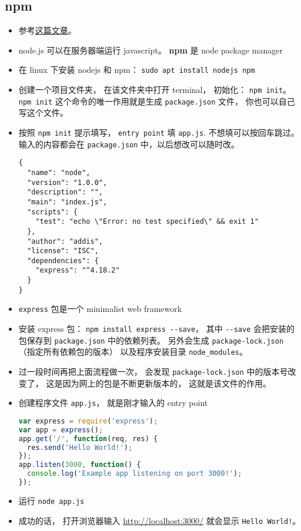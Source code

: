 \subsection{npm}
\begin{itemize}
\item 参考\href{https://medium.com/@adnanrahic/hello-world-app-with-node-js-and-express-c1eb7cfa8a30}{这篇文章}。
\item node.js 可以在服务器端运行 javascript。 \textbf{npm} 是 node package manager
\item 在 linux 下安装 nodejs 和 npm： \verb|sudo apt install nodejs npm|
\item 创建一个项目文件夹， 在该文件夹中打开 terminal， 初始化： \verb|npm init|。 \verb|npm init| 这个命令的唯一作用就是生成 \verb`package.json` 文件， 你也可以自己写这个文件。
\item 按照 \verb|npm init| 提示填写， \verb|entry point| 填 \verb`app.js`. 不想填可以按回车跳过。 输入的内容都会在 \verb|package.json| 中，以后想改可以随时改。
\begin{lstlisting}[language=none,caption=package.json 示例]
{
  "name": "node",
  "version": "1.0.0",
  "description": "",
  "main": "index.js",
  "scripts": {
    "test": "echo \"Error: no test specified\" && exit 1"
  },
  "author": "addis",
  "license": "ISC",
  "dependencies": {
    "express": "^4.18.2"
  }
}
\end{lstlisting}
\item \verb|express| 包是一个 minimalist web framework
\item 安装 express 包： \verb|npm install express --save|， 其中 \verb|--save| 会把安装的包保存到 \verb|package.json| 中的依赖列表。 另外会生成 \verb|package-lock.json| （指定所有依赖包的版本） 以及程序安装目录 \verb|node_modules|。
\item 过一段时间再把上面流程做一次， 会发现 \verb|package-lock.json| 中的版本号改变了， 这是因为网上的包是不断更新版本的， 这就是该文件的作用。
\item 创建程序文件 \verb|app.js|， 就是刚才输入的 entry point
\begin{lstlisting}[language=js]
var express = require('express');
var app = express();
app.get('/', function(req, res) {
  res.send('Hello World!');
});
app.listen(3000, function() {
  console.log('Example app listening on port 3000!');
});
\end{lstlisting}
\item 运行 \verb|node app.js|
\item 成功的话， 打开浏览器输入 \href{http://localhost:3000/}{http://localhost:3000/} 就会显示 \verb|Hello World!|。
\end{itemize}
